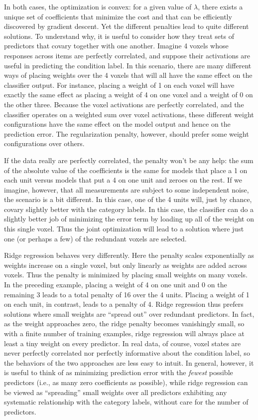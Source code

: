 In both cases, the optimization is convex: for a given value of $\lambda$, there exists a unique set of coefficients that minimize the cost and that can be efficiently discovered by gradient descent. Yet the different penalties lead to quite different solutions. To understand why, it is useful to consider how they treat sets of predictors that covary together with one another. Imagine 4 voxels whose responses across items are perfectly correlated, and suppose their activations are useful in predicting the condition label. In this scenario, there are many different ways of placing weights over the 4 voxels that will all have the same effect on the classifier output. For instance, placing a weight of 1 on each voxel will have exactly the same effect as placing a weight of 4 on one voxel and a weight of 0 on the other three. Because the voxel activations are perfectly correlated, and the classifier operates on a weighted sum over voxel activations, these different weight configurations have the same effect on the model output and hence on the prediction error. The regularization penalty, however, should prefer some weight configurations over others.

If the data really are perfectly correlated, the {\lasso} penalty won't be any help: the sum of the absolute value of the coefficients is the same for models that place a 1 on each unit versus models that put a 4 on one unit and zeroes on the rest. If we imagine, however, that all measurements are subject to some independent noise, the scenario is a bit different. In this case, one of the 4 units will, just by chance, covary slightly better with the category labels. In this case, the classifier can do a slightly better job of minimizing the error term by loading up all of the weight on this single voxel. Thus the joint optimization will lead to a solution where just one (or perhaps a few) of the redundant voxels are selected. 

Ridge regression behaves very differently. Here the penalty scales exponentially as weights increase on a single voxel, but only linearly as weights are added across voxels. Thus the penalty is minimized by placing small weights on many voxels. In the preceding example, placing a weight of 4 on one unit and 0 on the remaining 3 leads to a total penalty of 16 over the 4 units. Placing a weight of 1 on each unit, in contrast, leads to a penalty of 4. Ridge regression thus prefers solutions where small weights are ``spread out'' over redundant predictors. In fact, as the weight approaches zero, the ridge penalty becomes vanishingly small, so with a finite number of training examples, ridge regression will always place at least a tiny weight on every predictor. In real data, of course, voxel states are never perfectly correlated nor perfectly informative about the condition label, so the behaviors of the two approaches are less easy to intuit. In general, however, it is useful to think of {\lasso} as minimizing prediction error with the {\em fewest} possible predictors (i.e., as many zero coefficients as possible), while ridge regression can be viewed as ``spreading'' small weights over all predictors exhibiting any systematic relationship with the category labels, without care for the number of predictors. 

